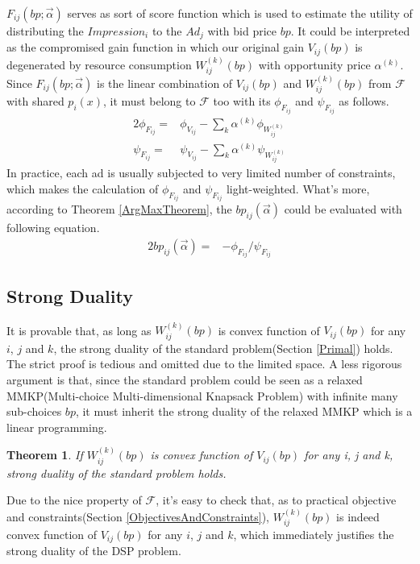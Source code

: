 \documentclass{article}
\newtheorem{theorem}{Theorem}[section]
\newcommand{\sbp}{bp_{ij}}
\newcommand{\sV}{V_{ij}}
\newcommand{\sW}{W_{ij}^{(k)}}
\newcommand{\salpha}{\alpha^{(k)}}
\newcommand{\sF}{F_{ij}}
\newcommand{\valpha}{\vec{\alpha}}
\newcommand{\pprob}{\phi}
\newcommand{\pcost}{\psi}
\newcommand{\uff}{\mathscr{F}}
\begin{document}
$\sF(bp; \valpha)$ serves as sort of score function which is used to estimate
    the utility of distributing the $Impression_i$ to the $Ad_j$ with bid price $bp$.
It could be interpreted as the compromised gain function in which
    our original gain $\sV(bp)$ is degenerated by resource consumption $\sW(bp)$ with opportunity price $\salpha$.
Since $\sF(bp; \valpha)$ is the linear combination of $\sV(bp)$ and $\sW(bp)$ from $\uff$ with shared $p_i(x)$,
    it must belong to $\uff$ too with its $\pprob_{\sF}$ and $\pcost_{\sF}$ as follows.
\begin{alignat}{2}
\pprob_{\sF}= & \pprob_{\sV} - \sum\limits_k \salpha \pprob_{\sW} \\
\pcost_{\sF}= & \pcost_{\sV} - \sum\limits_k \salpha \pcost_{\sW}
\end{alignat}
In practice, each ad is usually subjected to very limited number of constraints,
    which makes the calculation of $\pprob_{\sF}$ and $\pcost_{\sF}$ light-weighted.
What's more, according to Theorem \ref{ArgMaxTheorem}, the $\sbp(\valpha)$ could be evaluated with following equation.
\begin{alignat}{2}
\sbp(\valpha)= & - \pprob_{\sF} / \pcost_{\sF}
\end{alignat}

\subsection{Strong Duality}

It is provable that, as long as $\sW(bp)$ is convex function of $\sV(bp)$ for any $i$, $j$ and $k$,
    the strong duality of the standard problem(Section \ref{Primal}) holds.
The strict proof is tedious and omitted due to the limited space.
A less rigorous argument is that, since the standard problem could be seen as
    a relaxed MMKP(Multi-choice Multi-dimensional Knapsack Problem) with infinite many sub-choices $bp$,
    it must inherit the strong duality of the relaxed MMKP which is a linear programming.

\begin{theorem} \label{StrongDualityTheorem}
If $\sW(bp)$ is convex function of $\sV(bp)$ for any i, j and k, strong duality of the standard problem holds.
\end{theorem}

Due to the nice property of $\uff$, it's easy to check that,
    as to practical objective and constraints(Section \ref{ObjectivesAndConstraints}),
    $\sW(bp)$ is indeed convex function of $\sV(bp)$ for any $i$, $j$ and $k$,
    which immediately justifies the strong duality of the DSP problem.
\end{document}
